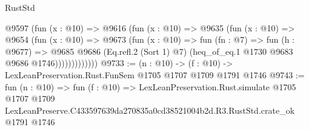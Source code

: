 \begin{lexlean}{RustStd}
\begin{coremodule}
                @9597
                  (fun (x : @10) =>
                  @9616
                    (fun (x : @10) =>
                    @9635
                      (fun (x : @10) =>
                      @9654
                        (fun (x : @10) =>
                        @9673
                          (fun (x : @10) =>
                          fun (fn : @7) =>
                          fun (h : @9677) =>
                          @9685
                            @9686
                            (Eq.refl.{2} (Sort 1) @7)
                            (heq_of_eq.{1} @1730 @9683 @9686 @1746)))))))))))))
@9733 := (n : @10) -> (f : @10) -> LexLeanPreservation.Rust.FunSem @1705 @1707 @1709 @1791 @1746
@9743 := fun (n : @10) =>
  fun (f : @10) =>
  LexLeanPreservation.Rust.simulate
    @1705
    @1707
    @1709
    LexLeanPreserve.C433597639da270835a0cd38521004b2d.R3.RustStd.crate_ok
    @1791
    @1746
\end{coremodule}
\end{lexlean}
